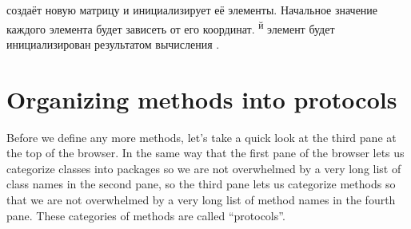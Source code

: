\documentclass[a4paper,10pt,twoside]{book}
\begin{document}
{%
 создаёт новую матрицу  и инициализирует её элементы. Начальное значение каждого элемента будет зависеть от его координат. \textsuperscript{й} элемент будет инициализирован результатом вычисления .





\section{Organizing methods into protocols}

Before we define any more methods, let's take a quick look at the third pane at the top of the browser.
In the same way that the first pane of the browser lets us categorize classes into packages so we are not overwhelmed by a very long list of class names in the second pane, so the third pane lets us categorize methods so that we are not overwhelmed by a very long list of method names in the fourth pane.   
These categories of methods are called ``protocols''.

}
\end{document}
